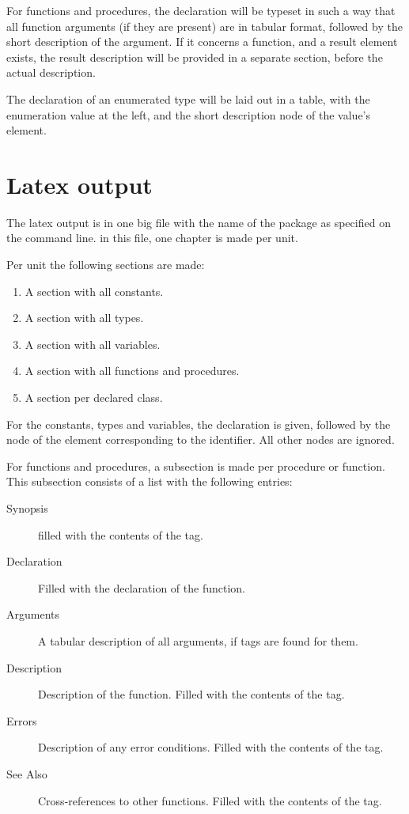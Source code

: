 For functions and procedures, the declaration will be typeset in such a way
that all function arguments (if they are present) are in tabular format, 
followed by the short description of the argument. If it concerns a
function, and a result element exists, the result description will be
provided in a separate section, before the actual description.

The declaration of an enumerated type will be laid out in a table, with the
enumeration value at the left, and the short description node of the value's 
element.


\section{Latex output}

The latex output is in one big file with the name of the package as
specified on the command line. in this file, one chapter is made per 
unit.

Per unit the following sections are made:

\begin{enumerate}
\item A section with all constants.
\item A section with all types.
\item A section with all variables.
\item A section with all functions and procedures.
\item A section per declared class.
\end{enumerate}

For the constants, types and variables, the declaration is given, followed
by the  node of the element corresponding to the identifier.
All other nodes are ignored. 

For functions and procedures, a subsection is made per procedure or
function. This subsection consists of a list with the following entries:
\begin{description}
\item[Synopsis] filled with the contents of the  tag.
\item[Declaration] Filled with the declaration of the function.
\item[Arguments] A tabular description of all arguments, if  tags
are found for them.
\item[Description] Description of the function. Filled with the contents of
the  tag.
\item[Errors] Description of any error conditions. Filled with the contents
of the  tag.
\item[See Also] Cross-references to other functions. Filled with the
contents of the  tag.
\end{description}

